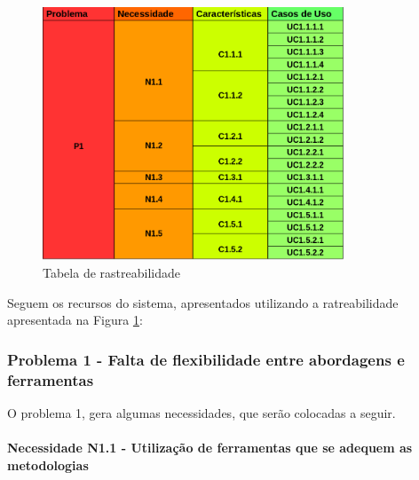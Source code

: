 \begin{figure}[H]
	\centering
	\includegraphics[width=0.8\textwidth]{imgModelagem/tabelaRastreabilidade}
	\caption{Tabela de rastreabilidade}
	\label{img:tabelaRastreabilidade}
\end{figure}

Seguem os recursos do sistema, apresentados utilizando a ratreabilidade apresentada na Figura \ref{img:tabelaRastreabilidade}:

\subsubsection{Problema 1 - Falta de flexibilidade entre abordagens e ferramentas}

O problema 1, gera algumas necessidades, que serão colocadas a seguir.

\paragraph{Necessidade N1.1 - Utilização de ferramentas que se adequem as metodologias}

